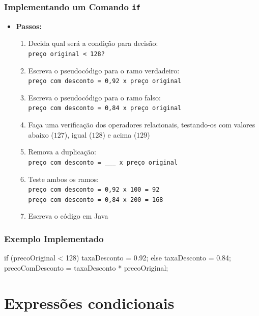\documentclass[xcolor={dvipsnames,table},aspectratio=169]{beamer}
\begin{document}
\begin{frame}\frametitle{Implementando um Comando \texttt{if}}
\begin{itemize}
\item \textbf{Passos:}
	\begin{enumerate}
		\item Decida qual será a condição para decisão:\\ \texttt{preço original < 128?}
		\item Escreva o pseudocódigo para o ramo verdadeiro:\\ \texttt{preço com desconto = 0,92 x preço original}
		\item Escreva o pseudocódigo para o ramo falso:\\ \texttt{preço com desconto = 0,84 x preço original}
		\item Faça uma verificação dos operadores relacionais, testando-os com valores abaixo ($127$), igual ($128$) e acima ($129$)
		\item Remova a duplicação:\\ \texttt{preço com desconto = \_\_\_ x preço original}
		\item Teste ambos os ramos:\\ \texttt{preço com desconto = 0,92 x 100 = 92\\preço com desconto = 0,84 x 200 = 168}
		\item Escreva o código em Java
	\end{enumerate}
\end{itemize}
\end{frame}

\begin{frame}[fragile]\frametitle{Exemplo Implementado}
\begin{javacode}
if (precoOriginal < 128) {
   taxaDesconto = 0.92;
}
else {
   taxaDesconto = 0.84;
}
precoComDesconto = taxaDesconto * precoOriginal;
\end{javacode}
\end{frame}

\section{Expressões condicionais}
\end{document}
